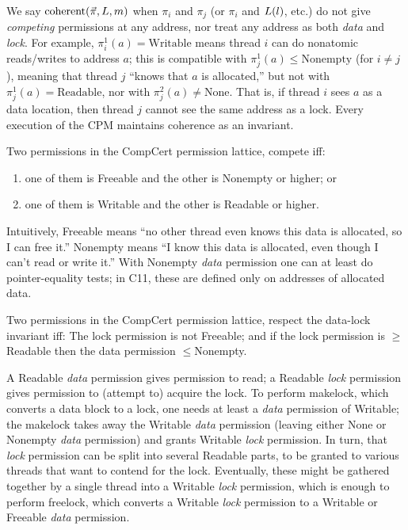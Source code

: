 We say $  \mathrm{coherent}(\vec{\pi},L,m )$
when 
$\pi_i$ and $\pi_j$ (or $\pi_i$ and $L(l)$, etc.)
do not give \emph{competing} permissions at any address,
nor treat any address as both \emph{data} and \emph{lock}.
For example, $\pi_i^1(a)=\mathrm{Writable}$
means thread $i$ can do nonatomic reads/writes to address $a$;
this is compatible with
$\pi_j^1(a) \le \mathrm{Nonempty}$ (for $i\not=j$),
meaning that thread $j$ ``knows that $a$ is allocated,''
but not with $\pi_j^1(a)=\mathrm{Readable}$,
nor with $\pi_j^2(a)\not=\mathrm{None}$.
That is, if thread $i$ sees $a$ as a data
location, then thread $j$ cannot see the same address as
a lock. Every execution of the CPM maintains coherence as an invariant.


\begin{definition}
  \label{def:comp-perm}
  Two permissions in the CompCert permission lattice, compete iff:
  \begin{enumerate}
  \item one of them is Freeable and the other is Nonempty or higher; or
  \item one of them is Writable and the other is Readable or higher.
  \end{enumerate}
\end{definition}
Intuitively, Freeable means ``no other thread even knows this data is allocated, so I can free it.''  Nonempty means ``I know this data is allocated, even though I can't read or write it.''  With Nonempty \emph{data} permission one can at least do pointer-equality tests; in C11, these are defined only on
addresses of allocated data.


\begin{definition}
  \label{def:data-lock}
  Two permissions in the CompCert permission lattice, respect the data-lock
  invariant iff: The lock permission is not Freeable; and if the lock permission
  is $\ge$Readable then the data permission $\le$Nonempty.
\end{definition}
A Readable \emph{data} permission gives permission to read; a Readable \emph{lock} permission gives permission to (attempt to) acquire the lock.
To perform \textsf{makelock}, which converts a data block to a lock, one needs at least a \emph{data} permission of Writable; the \textsf{makelock} takes away
the Writable \emph{data} permission (leaving either None or Nonempty \emph{data} permission) and grants Writable \emph{lock} permission.  In turn, that \emph{lock} permission can be split into several Readable parts, to be granted to various threads that want to contend for the lock.  Eventually, these might be gathered together by a single thread into a Writable \emph{lock} permission,
which is enough to perform \textsf{freelock}, which converts a
Writable \emph{lock} permission to a Writable or Freeable \emph{data} permission.

